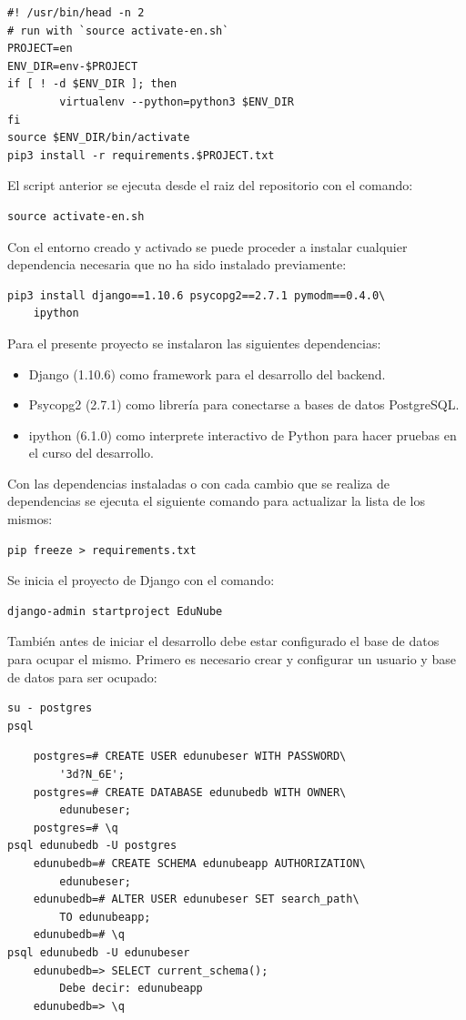 \begin{lstlisting}
#! /usr/bin/head -n 2
# run with `source activate-en.sh`
PROJECT=en
ENV_DIR=env-$PROJECT
if [ ! -d $ENV_DIR ]; then
        virtualenv --python=python3 $ENV_DIR
fi
source $ENV_DIR/bin/activate
pip3 install -r requirements.$PROJECT.txt
\end{lstlisting}

El script anterior se ejecuta desde el raiz del repositorio con el comando:

\begin{lstlisting}
source activate-en.sh
\end{lstlisting}

Con el entorno creado y activado se puede proceder a instalar cualquier dependencia necesaria que no ha sido instalado previamente:

\begin{lstlisting}
pip3 install django==1.10.6 psycopg2==2.7.1 pymodm==0.4.0\
	ipython
\end{lstlisting}

Para el presente proyecto se instalaron las siguientes dependencias:
\begin{itemize}
	\item Django (1.10.6) como framework para el desarrollo del backend.
    \item Psycopg2 (2.7.1) como librería para conectarse a bases de datos PostgreSQL.
    \item ipython (6.1.0) como interprete interactivo de Python para hacer pruebas en el curso del desarrollo.
\end{itemize}

Con las dependencias instaladas o con cada cambio que se realiza de dependencias se ejecuta el siguiente comando para actualizar la lista de los mismos:

\begin{lstlisting}
pip freeze > requirements.txt
\end{lstlisting}

Se inicia el proyecto de Django con el comando:

\begin{lstlisting}
django-admin startproject EduNube
\end{lstlisting}

También antes de iniciar el desarrollo debe estar configurado el base de datos para ocupar el mismo. Primero es necesario crear y configurar un usuario y base de datos para ser ocupado:

\begin{lstlisting}
su - postgres
psql
\end{lstlisting}
\begin{lstlisting}
	postgres=# CREATE USER edunubeser WITH PASSWORD\
    	'3d?N_6E';
	postgres=# CREATE DATABASE edunubedb WITH OWNER\
    	edunubeser;
	postgres=# \q
psql edunubedb -U postgres
	edunubedb=# CREATE SCHEMA edunubeapp AUTHORIZATION\
    	edunubeser;
	edunubedb=# ALTER USER edunubeser SET search_path\
    	TO edunubeapp;
	edunubedb=# \q
psql edunubedb -U edunubeser
	edunubedb=> SELECT current_schema();
		Debe decir: edunubeapp
	edunubedb=> \q
\end{lstlisting}

